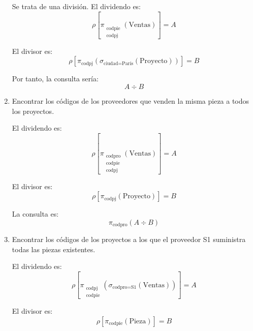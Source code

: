 \begin{ejercicio}
\begin{enumerate}
        Se trata de una división. El dividendo es:
        \begin{equation*}
            \rho\left[\pi_{\substack{\text{codpie}\\\text{codpj}}}\left(\text{Ventas}\right)\right]=A
        \end{equation*}

        El divisor es:
        \begin{equation*}
            \rho\left[\pi_{\text{codpj}}\left(\sigma_{\text{ciudad}=\text{París}}(\text{Proyecto})\right)\right]=B
        \end{equation*}

        Por tanto, la consulta sería:
        \begin{equation*}
            A \div B
        \end{equation*}

        \item Encontrar los códigos de los proveedores que venden la misma pieza a todos los proyectos.
        
        El dividendo es:
        \begin{equation*}
            \rho\left[\pi_{\substack{\text{codpro}\\\text{codpie}\\\text{codpj}}}(\text{Ventas})\right]=A
        \end{equation*}

        El divisor es:
        \begin{equation*}
            \rho\left[\pi_{\text{codpj}}(\text{Proyecto})\right]=B
        \end{equation*}

        La consulta es:
        \begin{equation*}
            \pi_{\text{codpro}}(A\div B)
        \end{equation*}
        \item Encontrar los códigos de los proyectos a los que el proveedor S1 suministra todas las piezas existentes.
        
        El dividendo es:
        \begin{equation*}
            \rho\left[\pi_{\substack{\text{codpj}\\\text{codpie}}}\left(\sigma_{\text{codpro}=\text{S1}}(\text{Ventas})\right)\right]=A
        \end{equation*}

        El divisor es:
        \begin{equation*}
            \rho\left[\pi_{\text{codpie}}(\text{Pieza})\right]=B
        \end{equation*}


\end{enumerate}
\end{ejercicio}
